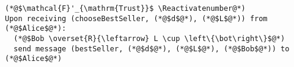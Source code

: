 \Suppressnumber
\begin{lstlisting}[label=badtrustfunc, style=numbers]
(*@$\mathcal{F}'_{\mathrm{Trust}}$ \Reactivatenumber@*)
Upon receiving (chooseBestSeller, (*@$d$@*), (*@$L$@*)) from (*@$Alice$@*):
  (*@$Bob \overset{R}{\leftarrow} L \cup \left\{\bot\right\}$@*)
  send message (bestSeller, (*@$d$@*), (*@$L$@*), (*@$Bob$@*)) to (*@$Alice$@*)
\end{lstlisting}
